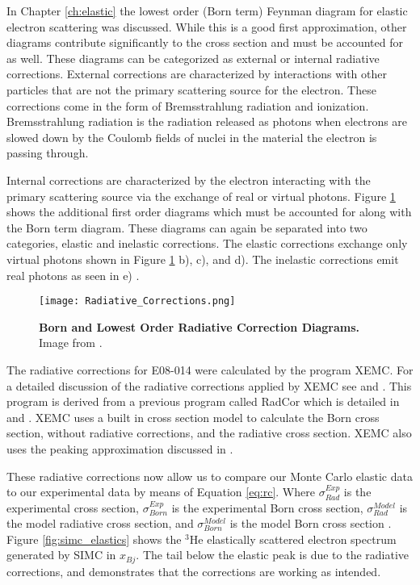 In Chapter \ref{ch:elastic} the lowest order (Born term) Feynman diagram for elastic electron scattering was discussed. While this is a good first approximation, other diagrams contribute significantly to the cross section and must be accounted for as well. These diagrams can be categorized as external or internal radiative corrections. External corrections are characterized by interactions with other particles that are not the primary scattering source for the electron. These corrections come in the form of Bremsstrahlung radiation and ionization. Bremsstrahlung radiation is the radiation released as photons when electrons are slowed down by the Coulomb fields of nuclei in the material the electron is passing through. 

Internal corrections are characterized by the electron interacting with the primary scattering source via the exchange of real or virtual photons. Figure \ref{fig:rc} shows the additional first order diagrams which must be accounted for along with the Born term diagram. These diagrams can again be separated into two categories, elastic and inelastic corrections. The elastic corrections exchange only virtual photons shown in Figure \ref{fig:rc} b), c), and d). The inelastic corrections emit real photons as seen in e) \cite{Thesis:Wang}.

\begin{figure}[!ht]
\begin{center}
\texttt{[image: Radiative\_Corrections.png]}
\end{center}
\caption[Born and Lowest Order Radiative Correction Diagrams]{
{\bf{Born and Lowest Order Radiative Correction Diagrams.}} Image from \cite{Thesis:Wang}.}
\label{fig:rc}
\end{figure}

The radiative corrections for E08-014 were calculated by the program XEMC. For a detailed discussion of the radiative corrections applied by XEMC see \cite{Article:RC} and \cite{Article:RC2}. This program is derived from a previous program called RadCor which is detailed in \cite{Thesis:Yao} and \cite{Thesis:Slifer}. XEMC uses a built in cross section model to calculate the Born cross section, without radiative corrections, and the radiative cross section. XEMC also uses the peaking approximation discussed in \cite{Article:RC2}. 

These radiative corrections now allow us to compare our Monte Carlo elastic data to our experimental data by means of Equation \ref{eq:rc}. Where $\sigma^{Exp}_{Rad}$ is the experimental cross section, $\sigma^{Exp}_{Born}$ is the experimental Born cross section, $\sigma^{Model}_{Rad}$ is the model radiative cross section, and $\sigma^{Model}_{Born}$ is the model Born cross section \cite{Thesis:Ye}. Figure \ref{fig:simc_elastics} shows the $^3$He elastically scattered electron spectrum generated by SIMC in $x_{Bj}$. The tail below the elastic peak is due to the radiative corrections, and demonstrates that the corrections are working as intended.

